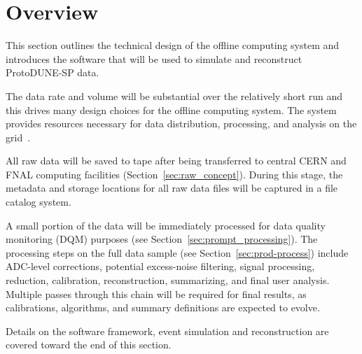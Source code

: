 \section{Overview}

This section outlines the technical design of the offline computing
system and introduces the software that will be used to simulate and reconstruct ProtoDUNE-SP data.


The data rate and volume will be substantial  over the relatively short
run and this drives many design choices for the offline computing
system.  The system provides resources necessary for data
distribution, processing, and analysis on the
grid~\cite{data_managm_sys}.

All raw data will be saved to tape after being transferred to central
CERN and FNAL computing facilities (Section~\ref{sec:raw_concept}).
During this stage, the metadata and storage locations for all raw data files
will be captured in a file catalog system.

A small portion of the data will be immediately processed for  
data quality monitoring (DQM) purposes (see Section~\ref{sec:prompt_processing}).
%
The processing steps on the full data sample (see
Section~\ref{sec:prod-process}) include ADC-level corrections,
potential excess-noise filtering, signal processing, reduction,
calibration, reconstruction, summarizing, and final user analysis.
Multiple passes through this chain will be required for final results,
as calibrations, algorithms, and summary definitions are expected to
evolve.  

Details on the software framework, event simulation and
reconstruction are covered toward the end of this section.

